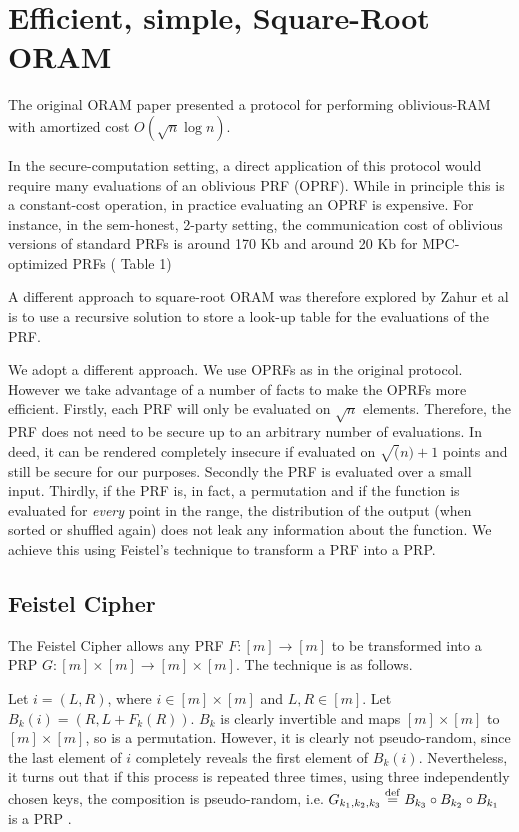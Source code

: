\section{Efficient, simple, Square-Root ORAM}

The original ORAM paper \cite{ostrovsky1997private} presented a protocol for performing
oblivious-RAM with amortized cost $O(\sqrt{n} \log{n})$.

In the secure-computation setting, a direct application of this
protocol would require many evaluations of an oblivious PRF (OPRF).
While in principle this is a constant-cost operation, in practice evaluating an OPRF is expensive. For instance, in the sem-honest, 2-party setting, the communication cost of oblivious versions of standard PRFs is around 170 Kb and around 20 Kb for MPC-optimized PRFs (\cite{hemenway2019private} Table 1) %

A different approach to square-root ORAM was therefore explored by Zahur et al is to use a recursive solution to store a look-up table for the evaluations of the PRF.

We adopt a different approach. We use OPRFs as in the original protocol.
However we take advantage of a number of facts to make the OPRFs more efficient.
Firstly, each PRF will only be evaluated on $\sqrt{n}$ elements.
Therefore, the PRF does not need to be secure up to an arbitrary number of 
evaluations. In deed, it can be rendered completely insecure if evaluated
on $\sqrt(n) + 1$ points and still be secure for our purposes.
Secondly the PRF is evaluated over a small input.
Thirdly, if the PRF is, in fact, a permutation and 
if the function is evaluated for \emph{every} point in the range,
the distribution of the output (when sorted or shuffled again)
does not leak any information about the function.
We achieve this using Feistel's technique to transform a PRF into a PRP.

\subsection{Feistel Cipher}

The Feistel Cipher allows any PRF $F : [m] \rightarrow[m]$ to be transformed
into a PRP $G : [m] \times [m] \rightarrow [m] \times [m]$. The technique is as follows.

Let $i = (L, R)$, where $i \in [m] \times [m]$ and $L, R \in [m]$.
Let $B_k(i) = (R, L + F_k(R))$.
$B_k$ is clearly invertible and maps $[m] \times [m]$ to $[m] \times [m]$, so is a permutation.
However, it is clearly not pseudo-random, since the last element of $i$ 
completely reveals the first element of $B_k(i)$.
Nevertheless, it turns out that if this process is repeated three times,
using three independently chosen keys, the composition is pseudo-random,
i.e. $G_{k_1, k_2, k_3} \stackrel{\mathrm{def}}{=} B_{k_3} \circ B_{k_2} \circ B_{k_1}$ is a PRP
\cite{luby1988construct}.


